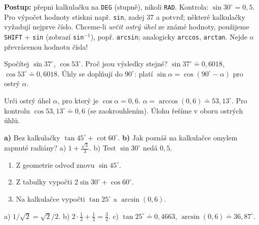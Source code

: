 \documentclass[11pt,a4paper]{article}
\begin{document}
\newpage
{}
\textbf{Postup:} přepni kalkulačku na \texttt{DEG} (stupně), nikoli
\texttt{RAD}. Kontrola: $\sin30^\circ=0{,}5$.
Pro výpočet hodnoty stiskni např. \texttt{sin}, zadej $37$ a potvrď;
některé kalkulačky vyžadují nejprve číslo.
Chceme-li \emph{určit ostrý úhel} ze známé hodnoty, použijeme
\texttt{SHIFT} + \texttt{sin} (zobrazí \texttt{sin\ensuremath{^{-1}}}),
popř. \texttt{arcsin}; analogicky \texttt{arccos}, \texttt{arctan}.
Nejde o převrácenou hodnotu čísla!
\begin{prikladReseniBox}[title={Příklad 3},breakable=false]
Spočítej $\sin37^\circ$, $\cos53^\circ$. Proč jsou výsledky stejné?
\tcblower
$\sin37^\circ\doteq0{,}6018$, $\cos53^\circ\doteq0{,}6018$.
Úhly se doplňují do $90^\circ$: platí
$\sin\alpha=\cos(90^\circ-\alpha)$ pro ostrý $\alpha$.
\end{prikladReseniBox}
\begin{prikladReseniBox}[title={Příklad 4},breakable=false]
Urči ostrý úhel $\alpha$, pro který je $\cos\alpha=0{,}6$.
\tcblower
$\alpha=\arccos(0{,}6)\doteq53{,}13^\circ$.
Pro kontrolu $\cos53{,}13^\circ\doteq0{,}6$ (se zaokrouhlením).
Úlohu řešíme v oboru ostrých úhlů.
\end{prikladReseniBox}
\begin{zadaniReseniBox}[title={Samostatná práce 1},breakable=false]
\textbf{a)} Bez kalkulačky $\tan45^\circ+\cot60^\circ$.
\quad \textbf{b)} Jak poznáš na kalkulačce omylem zapnuté radiány?
\tcblower
a) $1+\frac{\sqrt3}{3}$. b) Test $\sin30^\circ$ nedá $0{,}5$.
\end{zadaniReseniBox}
\begin{zadaniReseniBox}[title={Domácí úkol},breakable=false]
\begin{enumerate}[label=\alph*)]
\item Z geometrie odvoď znovu $\sin45^\circ$.
\item Z tabulky vypočti $2\sin30^\circ+\cos60^\circ$.
\item Na kalkulačce vypočti $\tan25^\circ$ a $\arcsin(0{,}6)$.
\end{enumerate}
\tcblower
a) $1/\sqrt2=\sqrt2/2$.
b) $2\cdot\frac12+\frac12=\frac32$.
c) $\tan25^\circ\doteq0{,}4663$, $\arcsin(0{,}6)\doteq36{,}87^\circ$.
\end{zadaniReseniBox}
\end{document}
